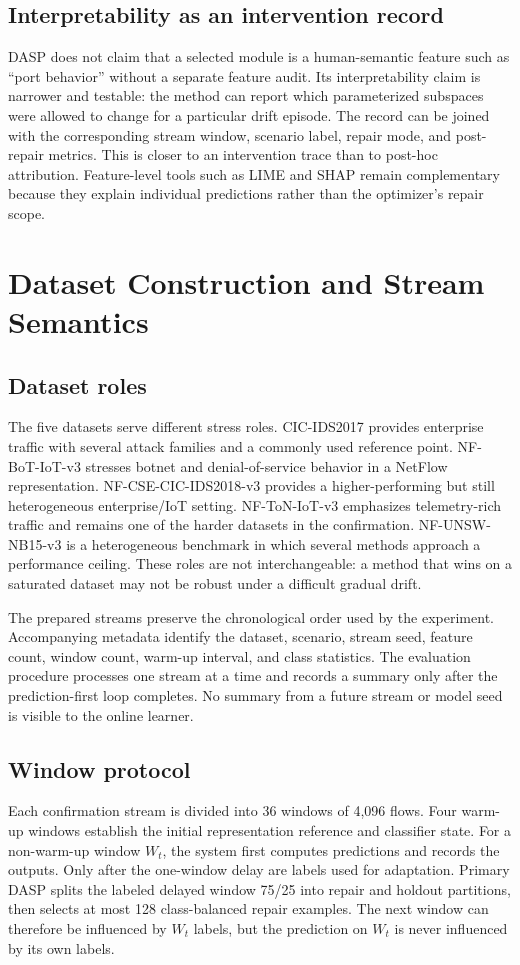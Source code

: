 \subsection{Interpretability as an intervention record}
DASP does not claim that a selected module is a human-semantic feature such as ``port behavior'' without a separate feature audit. Its interpretability claim is narrower and testable: the method can report which parameterized subspaces were allowed to change for a particular drift episode. The record can be joined with the corresponding stream window, scenario label, repair mode, and post-repair metrics. This is closer to an intervention trace than to post-hoc attribution. Feature-level tools such as LIME and SHAP remain complementary because they explain individual predictions rather than the optimizer's repair scope.

\section{Dataset Construction and Stream Semantics}
\label{sec:stream-semantics}

\subsection{Dataset roles}
The five datasets serve different stress roles. CIC-IDS2017 provides enterprise traffic with several attack families and a commonly used reference point. NF-BoT-IoT-v3 stresses botnet and denial-of-service behavior in a NetFlow representation. NF-CSE-CIC-IDS2018-v3 provides a higher-performing but still heterogeneous enterprise/IoT setting. NF-ToN-IoT-v3 emphasizes telemetry-rich traffic and remains one of the harder datasets in the confirmation. NF-UNSW-NB15-v3 is a heterogeneous benchmark in which several methods approach a performance ceiling. These roles are not interchangeable: a method that wins on a saturated dataset may not be robust under a difficult gradual drift.

The prepared streams preserve the chronological order used by the experiment. Accompanying metadata identify the dataset, scenario, stream seed, feature count, window count, warm-up interval, and class statistics. The evaluation procedure processes one stream at a time and records a summary only after the prediction-first loop completes. No summary from a future stream or model seed is visible to the online learner.

\subsection{Window protocol}
Each confirmation stream is divided into 36 windows of 4,096 flows. Four warm-up windows establish the initial representation reference and classifier state. For a non-warm-up window $W_t$, the system first computes predictions and records the outputs. Only after the one-window delay are labels used for adaptation. Primary DASP splits the labeled delayed window 75/25 into repair and holdout partitions, then selects at most 128 class-balanced repair examples. The next window can therefore be influenced by $W_t$ labels, but the prediction on $W_t$ is never influenced by its own labels.

